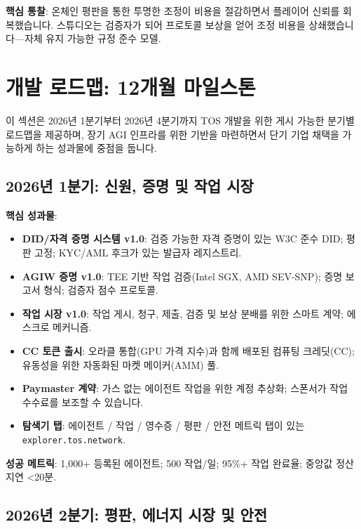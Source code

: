 \documentclass[11pt]{article}
\begin{document}
\textbf{핵심 통찰}: 온체인 평판을 통한 투명한 조정이 비용을 절감하면서 플레이어 신뢰를 회복했습니다. 스튜디오는 검증자가 되어 프로토콜 보상을 얻어 조정 비용을 상쇄했습니다—자체 유지 가능한 규정 준수 모델.

\section{개발 로드맵: 12개월 마일스톤}
\label{sec:12month-roadmap}

이 섹션은 2026년 1분기부터 2026년 4분기까지 TOS 개발을 위한 게시 가능한 분기별 로드맵을 제공하며, 장기 AGI 인프라를 위한 기반을 마련하면서 단기 기업 채택을 가능하게 하는 성과물에 중점을 둡니다.

\subsection{2026년 1분기: 신원, 증명 및 작업 시장}

\textbf{핵심 성과물}:
\begin{itemize}[noitemsep]
  \item \textbf{DID/자격 증명 시스템 v1.0}: 검증 가능한 자격 증명이 있는 W3C 준수 DID; 평판 고정; KYC/AML 후크가 있는 발급자 레지스트리.
  \item \textbf{AGIW 증명 v1.0}: TEE 기반 작업 검증(Intel SGX, AMD SEV-SNP); 증명 보고서 형식; 검증자 점수 프로토콜.
  \item \textbf{작업 시장 v1.0}: 작업 게시, 청구, 제출, 검증 및 보상 분배를 위한 스마트 계약; 에스크로 메커니즘.
  \item \textbf{CC 토큰 출시}: 오라클 통합(GPU 가격 지수)과 함께 배포된 컴퓨팅 크레딧(CC); 유동성을 위한 자동화된 마켓 메이커(AMM) 풀.
  \item \textbf{Paymaster 계약}: 가스 없는 에이전트 작업을 위한 계정 추상화; 스폰서가 작업 수수료를 보조할 수 있습니다.
  \item \textbf{탐색기 탭}: 에이전트 / 작업 / 영수증 / 평판 / 안전 메트릭 탭이 있는 \texttt{explorer.tos.network}.
\end{itemize}

\textbf{성공 메트릭}: 1,000+ 등록된 에이전트; 500 작업/일; 95\%+ 작업 완료율; 중앙값 정산 지연 <20분.

\subsection{2026년 2분기: 평판, 에너지 시장 및 안전}
\end{document}
